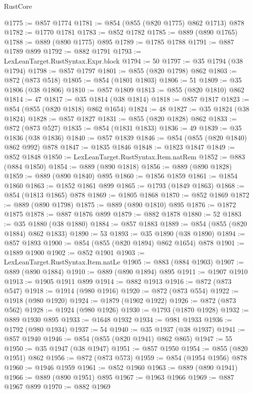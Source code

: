 \begin{lexlean}{RustCore}
\begin{coremodule}
@1775 := @857 @1774
@1781 := @854 (@855 (@820 @1775) @862 @1713) @878
@1782 := @1770 @1781
@1783 := @852 @1782
@1785 := @889 (@890 @1765)
@1788 := @889 (@890 @1775) @895
@1789 := @1785 @1788
@1791 := @887 @1789 @899
@1792 := @882 @1791
@1793 := LexLeanTarget.RustSyntax.Expr.block
@1794 := 50
@1797 := @35 @1794 (@38 @1794)
@1798 := @857 @1797
@1801 := @855 (@820 @1798) @862
@1803 := @872 (@873 @518)
@1805 := @854 (@1801 @1803)
@1806 := 51
@1809 := @35 @1806 (@38 @1806)
@1810 := @857 @1809
@1813 := @855 (@820 @1810) @862
@1814 := 47
@1817 := @35 @1814 (@38 @1814)
@1818 := @857 @1817
@1823 := @854 (@855 (@820 @1818) @862 @1654)
@1824 := 48
@1827 := @35 @1824 (@38 @1824)
@1828 := @857 @1827
@1831 := @855 (@820 @1828) @862
@1833 := @872 (@873 @527)
@1835 := @854 (@1831 @1833)
@1836 := 49
@1839 := @35 @1836 (@38 @1836)
@1840 := @857 @1839
@1846 := @854 (@855 (@820 @1840) @862 @992) @878
@1847 := @1835 @1846
@1848 := @1823 @1847
@1849 := @852 @1848
@1850 := LexLeanTarget.RustSyntax.Item.natRem
@1852 := @883 (@884 @1850)
@1854 := @889 (@890 @1818)
@1856 := @889 (@890 @1828)
@1859 := @889 (@890 @1840) @895
@1860 := @1856 @1859
@1861 := @1854 @1860
@1863 := @1852 @1861 @899
@1865 := @1793 (@1849 @1863)
@1868 := @854 (@1813 @1865) @878
@1869 := @1805 @1868
@1870 := @852 @1869
@1872 := @889 (@890 @1798)
@1875 := @889 (@890 @1810) @895
@1876 := @1872 @1875
@1878 := @887 @1876 @899
@1879 := @882 @1878
@1880 := 52
@1883 := @35 @1880 (@38 @1880)
@1884 := @857 @1883
@1889 := @854 (@855 (@820 @1884) @862 @1833)
@1890 := 53
@1893 := @35 @1890 (@38 @1890)
@1894 := @857 @1893
@1900 := @854 (@855 (@820 @1894) @862 @1654) @878
@1901 := @1889 @1900
@1902 := @852 @1901
@1903 := LexLeanTarget.RustSyntax.Item.natLe
@1905 := @883 (@884 @1903)
@1907 := @889 (@890 @1884)
@1910 := @889 (@890 @1894) @895
@1911 := @1907 @1910
@1913 := @1905 @1911 @899
@1914 := @882 @1913
@1916 := @872 (@873 @547)
@1918 := @1914 (@980 @1916)
@1920 := @872 (@873 @554)
@1922 := @1918 (@980 @1920)
@1924 := @1879 (@1902 @1922)
@1926 := @872 (@873 @562)
@1928 := @1924 (@980 @1926)
@1930 := @1793 (@1870 @1928)
@1932 := @889 @1930 @895
@1933 := @1648 @1932
@1934 := @981 @1933
@1936 := @1792 (@980 @1934)
@1937 := 54
@1940 := @35 @1937 (@38 @1937)
@1941 := @857 @1940
@1946 := @854 (@855 (@820 @1941) @862 @865)
@1947 := 55
@1950 := @35 @1947 (@38 @1947)
@1951 := @857 @1950
@1954 := @855 (@820 @1951) @862
@1956 := @872 (@873 @573)
@1959 := @854 (@1954 @1956) @878
@1960 := @1946 @1959
@1961 := @852 @1960
@1963 := @889 (@890 @1941)
@1966 := @889 (@890 @1951) @895
@1967 := @1963 @1966
@1969 := @887 @1967 @899
@1970 := @882 @1969

\end{coremodule}
\end{lexlean}
